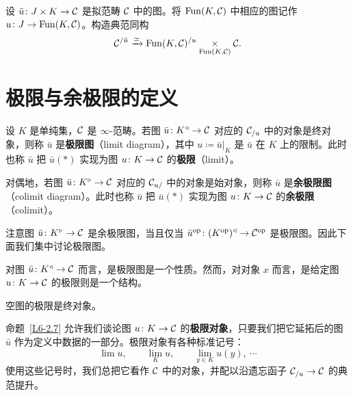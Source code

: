 \begin{exercise}\label{L6-5.12}
设 $\tilde u\colon J\times K\to\mathcal{C}$ 是拟范畴 $\mathcal{C}$ 中的图。将 $\operatorname{Fun}(K,\mathcal{C})$ 中相应的图记作 $u\colon J\to\operatorname{Fun}(K,\mathcal{C})$。构造典范同构
\begin{equation}\label{L6-eq-5.5}
\mathcal{C}^{/\tilde u}\xrightarrow{\simeq}\operatorname{Fun}(K,\mathcal{C})^{/u}\underset{\operatorname{Fun}(K,\mathcal{C})}{\times}\mathcal{C}.
\end{equation}
\end{exercise}

\section{极限与余极限的定义}

\begin{definition}\label{L6-6.1}
设 $K$ 是单纯集，$\mathcal{C}$ 是 $\infty$-范畴。若图 $\bar u\colon K^{\triangleleft}\to\mathcal{C}$ 对应的 $\mathcal{C}_{/u}$ 中的对象是终对象，则称 $\bar u$ 是\textbf{极限图}（limit diagram），其中 $u\coloneqq\bar u|_K$ 是 $\bar u$ 在 $K$ 上的限制。此时也称 $\bar u$ 把 $\bar u(\ast)$ 实现为图 $u\colon K\to\mathcal{C}$ 的\textbf{极限}（limit）。

对偶地，若图 $\bar u\colon K^{\triangleright}\to\mathcal{C}$ 对应的 $\mathcal{C}_{u/}$ 中的对象是始对象，则称 $\bar u$ 是\textbf{余极限图}（colimit diagram）。此时也称 $\bar u$ 把 $\bar u(\ast)$ 实现为图 $u\colon K\to\mathcal{C}$ 的\textbf{余极限}（colimit）。
\end{definition}

\nitem\label{L6-6.2} 注意图 $\bar u\colon K^{\triangleright}\to\mathcal{C}$ 是余极限图，当且仅当 $\bar u^{\mathrm{op}}\colon(K^{\mathrm{op}})^{\triangleleft}\to\mathcal{C}^{\mathrm{op}}$ 是极限图。因此下面我们集中讨论极限图。

\begin{remark}\label{L6-6.3}
对图 $\bar u\colon K^{\triangleleft}\to\mathcal{C}$ 而言，是极限图是一个性质。然而，对对象 $x$ 而言，是给定图 $u\colon K\to\mathcal{C}$ 的极限则是一个结构。
\end{remark}

\begin{exercise}\label{L6-6.4}
空图的极限是终对象。
\end{exercise}

\nitem\label{L6-6.5} 命题~\ref{L6-2.7} 允许我们谈论图 $u\colon K\to\mathcal{C}$ 的\textbf{极限对象}，只要我们把它延拓后的图 $\bar u$ 作为定义中数据的一部分。极限对象有各种标准记号：
\[
\lim u,\qquad \lim_K u,\qquad \lim_{y\in K} u(y),\ \cdots
\]
使用这些记号时，我们总把它看作 $\mathcal{C}$ 中的对象，并配以沿遗忘函子 $\mathcal{C}_{/u}\to\mathcal{C}$ 的典范提升。


